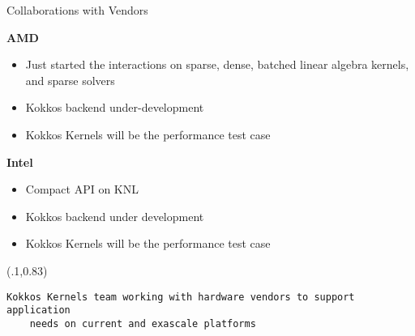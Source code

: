 \begin{frame}[fragile]{Collaborations with Vendors}

\textbf{AMD}
\begin{itemize}
  \item Just started the interactions on sparse, dense, batched linear algebra kernels, and sparse solvers
  \item Kokkos backend under-development
  \item Kokkos Kernels will be the performance test case
\end{itemize}

\textbf{Intel}
\begin{itemize}
  \item Compact API on KNL
  \item Kokkos backend under development
  \item Kokkos Kernels will be the performance test case
\end{itemize}

\begin{textblock*}{1.0\textwidth}(.1\textwidth,0.83\textheight)
  \begin{lstlisting}[frame=single, backgroundcolor=\color{blue!10}, basicstyle=\tiny, breaklines=true, boxpos=c]
    Kokkos Kernels team working with hardware vendors to support application 
    needs on current and exascale platforms
  \end{lstlisting}
\end{textblock*}

\end{frame}


